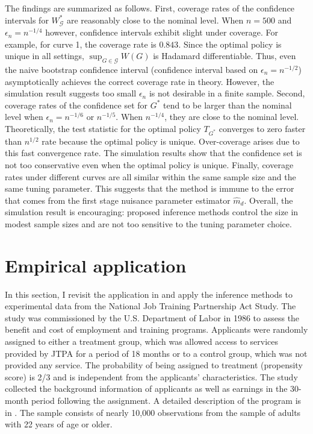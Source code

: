 \documentclass[12pt,oneside,reqno,english]{amsart}
\theoremstyle{definition}
\begin{document}
The findings are summarized as follows.
First, coverage rates of the confidence intervals for $W^{*}_{\mathcal{G}}$ are reasonably close to the nominal level.  
When $n=500$ and $\epsilon_{n}=n^{-1/4}$ however, confidence intervals exhibit slight under coverage. For example, for curve 1, the coverage rate is $0.843$. 
Since the optimal policy is unique in all settings, $\sup_{G\in \mathcal{G}}W(G)$ is Hadamard differentiable. 
Thus, even the naive bootstrap confidence interval (confidence interval based on $\epsilon_{n}=n^{-1/2}$) asymptotically achieves the correct coverage rate in theory. 
However, the simulation result suggests too small $\epsilon_{n}$ is not desirable in a finite sample. 
Second, coverage rates of the confidence set for $G^{*}$ tend to be larger than the nominal level when $\epsilon_{n}=n^{-1/6}$ or $n^{-1/5}$. 
When $n^{-1/4}$, they are close to the nominal level. 
Theoretically, the test statistic for the optimal policy $T_{G^{*}}$ converges to zero faster than $n^{1/2}$ rate because the optimal policy is unique. 
Over-coverage arises due to this fast convergence rate. The simulation results show that the confidence set is not too conservative even when the optimal policy is unique. 
Finally, coverage rates under different curves are all similar within the same sample size and the same tuning parameter. This suggests that the method is immune to the error that comes from the first stage nuisance parameter estimator $\hat{m}_{d}$.    
Overall, the simulation result is encouraging: proposed inference methods control the size in modest sample sizes and are not too sensitive to the tuning parameter choice.  

\section{Empirical application}\label{application}
In this section, I revisit the application in \cite{KT:18} 
and apply the inference methods to experimental data from the National Job Training Partnership Act Study. 
The study was commissioned by the U.S. Department of Labor in 1986 to assess the benefit and cost of employment and training programs. 
Applicants were randomly assigned to either a treatment group, which was allowed access to services provided by JTPA for a period of 18 months or to a control group, which was not provided any service. The probability of being assigned to treatment (propensity score) is 2/3 and is independent from the applicants' characteristics. 
The study collected the background information of applicants as well as earnings in the 30-month period following the assignment. 
A detailed description of the program is in 
\cite{Bloom:97}.
The sample consists of nearly 10,000 observations from the sample of adults with 22 years of age or older.
\end{document}
